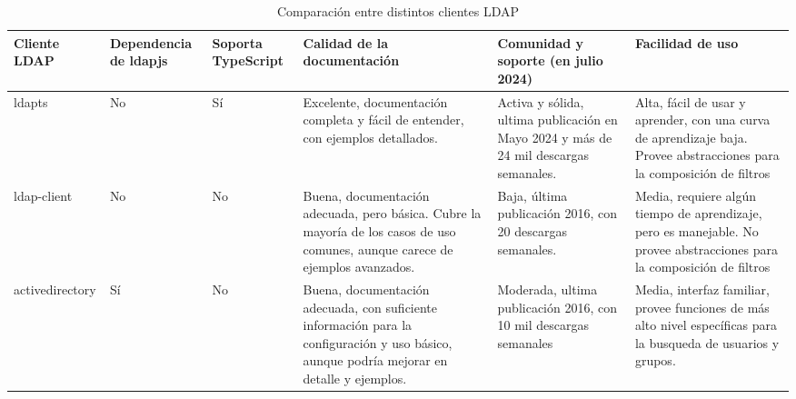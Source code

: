 \begin{landscape}
    \begin{longtable}{|l|p{3cm}|p{2.5cm}|p{6cm}|p{5cm}|p{6cm}|}
        \caption{Comparación entre distintos clientes LDAP}
        \label{table:ldap-client-comparison}                                                                                                                                                                                                                                                                                                                                                                                                               \\
        \hline
        \textbf{Cliente LDAP} & \textbf{Dependencia de ldapjs} & \textbf{Soporta TypeScript} & \textbf{Calidad de la documentación}                                                                                                       & \textbf{Comunidad y soporte (en julio 2024)}                                          & \textbf{Facilidad de uso}                                                                                              \\
        \hline
        \endfirsthead
        ldapts                & No                             & Sí                          & Excelente, documentación completa y fácil de entender, con ejemplos detallados.                                                            & Activa y sólida, ultima publicación en Mayo 2024 y más de 24 mil descargas semanales. & Alta, fácil de usar y aprender, con una curva de aprendizaje baja. Provee abstracciones para la composición de filtros \\
        \hline
        ldap-client           & No                             & No                          & Buena, documentación adecuada, pero básica. Cubre la mayoría de los casos de uso comunes, aunque carece de ejemplos avanzados.             & Baja, última publicación 2016, con 20 descargas semanales.                            & Media, requiere algún tiempo de aprendizaje, pero es manejable. No provee abstracciones para la composición de filtros \\
        \hline
        activedirectory       & Sí                             & No                          & Buena, documentación adecuada, con suficiente información para la configuración y uso básico, aunque podría mejorar en detalle y ejemplos. & Moderada, ultima publicación 2016, con 10 mil descargas semanales                     & Media, interfaz familiar, provee funciones de más alto nivel  específicas  para la busqueda de usuarios y grupos.      \\

\end{longtable}
\end{landscape}
